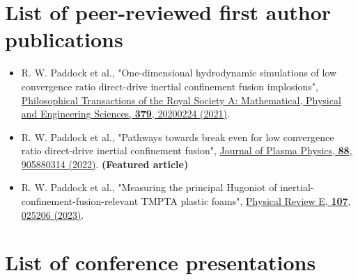 \section{List of peer-reviewed first author publications}

\begin{itemize}
	\item R. W. Paddock et al., "One-dimensional hydrodynamic simulations of low convergence ratio direct-drive inertial confinement fusion implosions", \href{https://doi.org/10.1098/rsta.2020.0224}{Philosophical Transactions of the Royal Society A: Mathematical, Physical and Engineering Sciences, \textbf{379}, 20200224 (2021)}.
	\item R. W. Paddock et al., "Pathways towards break even for low convergence ratio direct-drive inertial confinement fusion", \href{https://doi.org/10.1017/S0022377822000265}{Journal of Plasma Physics, \textbf{88}, 905880314 (2022)}. \textbf{(Featured article)}
	\item R. W. Paddock et al., "Measuring the principal Hugoniot of inertial-confinement-fusion-relevant TMPTA plastic foams", \href{https://doi.org/10.1103/PhysRevE.107.025206}{Physical Review E, \textbf{107}, 025206 (2023)}.
\end{itemize}

\section{List of conference presentations}

